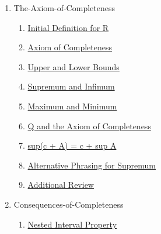 \clearpage
\renewcommand{\notetitle}{Table of Contents}
\label{toc}
\begin{enumerate}

\item The-Axiom-of-Completeness
\begin{enumerate}
\item \hyperref[202501180703]{Initial Definition for R}
\item \hyperref[202501180727]{Axiom of Completeness}
\item \hyperref[202501180734]{Upper and Lower Bounds}
\item \hyperref[202501180743]{Supremum and Infimum}
\item \hyperref[202501181241]{Maximum and Minimum}
\item \hyperref[202501181257]{Q and the Axiom of Completeness}
\item \hyperref[202501181310]{sup(c + A) = c + sup A}
\item \hyperref[202501181335]{Alternative Phrasing for Supremum}
\item \hyperref[202501181521]{Additional Review}
\end{enumerate}
\item Consequences-of-Completeness
\begin{enumerate}
\item \hyperref[202501191115]{Nested Interval Property}
\end{enumerate}
\end{enumerate}

\newpage
